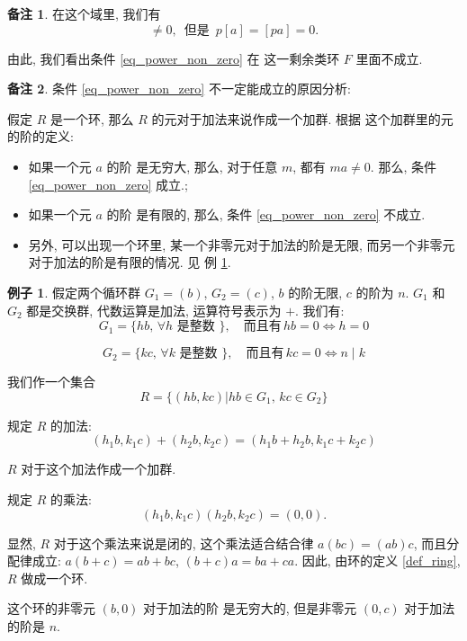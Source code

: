 \documentclass[utf8]{ctexbook}
\theoremstyle{definition}
\newtheorem{memo}{备注}[section]
\newtheorem{example}{例子}[section]
\begin{document}
\begin{memo}
在这个域里, 我们有
\begin{equation}
[a] \neq 0, \, \mbox{ 但是 } \, p [a] = [pa] = 0 .
\end{equation}

由此, 我们看出条件 \ref{eq_power_non_zero} 在 这一剩余类环 $F$ 里面不成立.

\end{memo}

\begin{memo}
条件 \ref{eq_power_non_zero} 不一定能成立的原因分析:

假定 $R$ 是一个环, 那么 $R$ 的元对于加法来说作成一个加群. 根据 这个加群里的元的阶的定义:
\begin{itemize}
\item{如果一个元 $a$ 的阶 是无穷大, 那么, 对于任意 $m$, 都有 $m a \neq 0$. 那么, 条件 \ref{eq_power_non_zero} 成立.;}
\item{如果一个元 $a$ 的阶 是有限的, 那么, 条件 \ref{eq_power_non_zero} 不成立.}
\item{另外, 可以出现一个环里, 某一个非零元对于加法的阶是无限, 而另一个非零元对于加法的阶是有限的情况. 见 例 \ref{example_finite_infinite_rank}.}
\end{itemize}
\end{memo}

\begin{example}
\label{example_finite_infinite_rank}
假定两个循环群 $G_1 = (b)$, $G_2 = (c)$, $b$ 的阶无限, $c$ 的阶为 $n$. $G_1$ 和 $G_2$ 都是交换群, 代数运算是加法, 运算符号表示为 $+$. 我们有:
\begin{equation}
G_1 = \{ hb , \, \forall h \mbox{ 是整数 } \}, \quad \mbox{而且有} \, hb = 0 \iff h = 0
\end{equation}

\begin{equation}
G_2 = \{ kc , \, \forall k \mbox{ 是整数 }  \}, \quad \mbox{而且有} \, kc = 0 \iff  n \mid k 
\end{equation}

我们作一个集合
\begin{equation}
R = \{ (hb, kc) | hb \in G_1, \, kc \in G_2  \}
\end{equation}

规定 $R$ 的加法:
\begin{equation}
(h_1 b , k_1 c ) + (h_2 b , k_2 c) = (h_1 b + h_2 b, k_1 c + k_2 c)
\end{equation}

$R$ 对于这个加法作成一个加群.

规定 $R$ 的乘法:
\begin{equation}
(h_1 b, k_1 c ) (h_2 b, k_2 c) = (0, 0).
\end{equation}

显然, $R$ 对于这个乘法来说是闭的, 这个乘法适合结合律 $a(bc) = (ab) c $, 而且分配律成立: $a(b+c)=ab + bc$, $(b+c)a=ba + ca$. 因此, 由环的定义 \ref{def_ring}, $R$ 做成一个环.

这个环的非零元 $(b, 0)$ 对于加法的阶 是无穷大的, 但是非零元 $(0, c)$ 对于加法的阶是 $n$.


\end{example}
\end{document}
